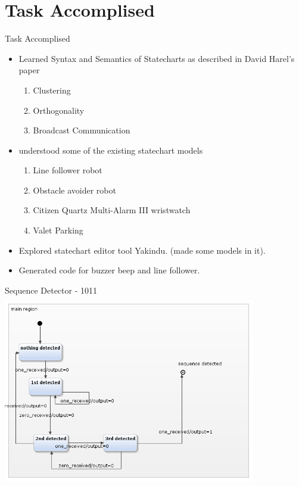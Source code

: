 \documentclass[10pt, a4paper]{beamer}
\begin{document}
\section{Task Accomplised}
\begin{frame}{Task Accomplised}
	\begin{itemize}
		\item Learned Syntax and Semantics of Statecharts as
		described in David Harel's paper
		\begin{enumerate}
			\item Clustering
			\item Orthogonality
			\item Broadcast Communication
		\end{enumerate}
		\item understood some of the existing statechart models
		\begin{enumerate}
			\item Line follower robot
			\item Obstacle avoider robot
			\item Citizen
			Quartz Multi-Alarm III wristwatch
			\item Valet Parking
		\end{enumerate}
	\item Explored statechart editor tool Yakindu. (made some models in it).
	\item Generated code for buzzer beep and line follower.
	\end{itemize}

\end{frame}
\begin{frame}{Sequence Detector - 1011}
\includegraphics[width=11cm, height=8.38cm]{sequence1011.png}
\end{frame}
\end{document}
